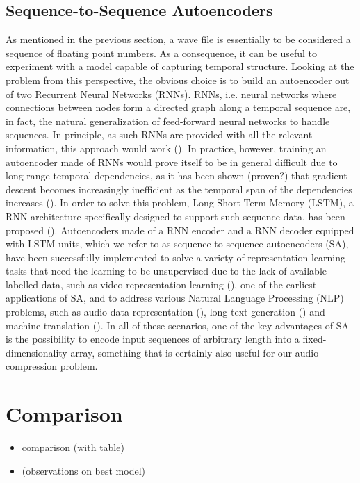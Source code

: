 \documentclass[11pt]{article}
\begin{document}
\subsection{Sequence-to-Sequence Autoencoders}
As mentioned in the previous section, a wave file is essentially to be considered a sequence of floating point numbers. As a consequence, it can be useful to experiment with a model capable of capturing temporal structure. Looking at the problem from this perspective, the obvious choice is to build an autoencoder out of two Recurrent Neural Networks (RNNs). RNNs, i.e. neural networks where connections between nodes form a directed graph along a temporal sequence are, in fact, the natural generalization of feed-forward neural networks to handle sequences. In principle, as such RNNs are provided with all the relevant information, this approach would work (\cite{Sutskever.2014}). In practice, however, training an autoencoder made of RNNs would prove itself to be in general difficult due to long range temporal dependencies, as it has been shown (proven?) that gradient descent becomes increasingly inefficient as the temporal span of the dependencies increases (\cite{Bengio.1994}). In order to solve this problem, Long Short Term Memory (LSTM), a RNN architecture specifically designed to support such sequence data, has been proposed (\cite{Hochreiter.1997}). Autoencoders made of a RNN encoder and a RNN decoder equipped with LSTM units, which we refer to as sequence to sequence autoencoders (SA), have been successfully implemented to solve a variety of representation learning tasks that need the learning to be unsupervised due to the lack of available labelled data, such as video representation learning (\cite{Srivastava.2015}), one of the earliest applications of SA, and to address various Natural Language Processing (NLP) problems, such as audio data representation (\cite{Yu.2016}), long text generation (\cite{Jiwei.2015}) and machine translation (\cite{Sutskever.2014}). In all of these scenarios, one of the key advantages of SA is the possibility to encode input sequences of arbitrary length into a fixed-dimensionality array, something that is certainly also useful for our audio compression problem.
\section{Comparison}
\begin{itemize}
    \item comparison (with table)
    \item (observations on best model)
\end{itemize}
\end{document}
